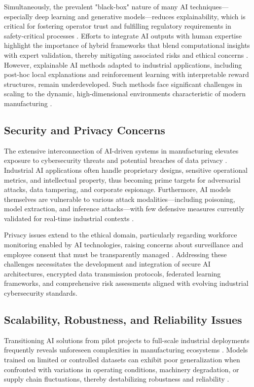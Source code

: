 \documentclass[sigconf]{acmart}
\begin{document}
Simultaneously, the prevalent "black-box" nature of many AI techniques—especially deep learning and generative models—reduces explainability, which is critical for fostering operator trust and fulfilling regulatory requirements in safety-critical processes \cite{ref2,ref34}. Efforts to integrate AI outputs with human expertise highlight the importance of hybrid frameworks that blend computational insights with expert validation, thereby mitigating associated risks and ethical concerns \cite{ref2}. However, explainable AI methods adapted to industrial applications, including post-hoc local explanations and reinforcement learning with interpretable reward structures, remain underdeveloped. Such methods face significant challenges in scaling to the dynamic, high-dimensional environments characteristic of modern manufacturing \cite{ref14,ref36}.

\subsection{Security and Privacy Concerns}

The extensive interconnection of AI-driven systems in manufacturing elevates exposure to cybersecurity threats and potential breaches of data privacy \cite{ref13,ref37}. Industrial AI applications often handle proprietary designs, sensitive operational metrics, and intellectual property, thus becoming prime targets for adversarial attacks, data tampering, and corporate espionage. Furthermore, AI models themselves are vulnerable to various attack modalities---including poisoning, model extraction, and inference attacks---with few defensive measures currently validated for real-time industrial contexts \cite{ref37,ref41}.

Privacy issues extend to the ethical domain, particularly regarding workforce monitoring enabled by AI technologies, raising concerns about surveillance and employee consent that must be transparently managed \cite{ref2}. Addressing these challenges necessitates the development and integration of secure AI architectures, encrypted data transmission protocols, federated learning frameworks, and comprehensive risk assessments aligned with evolving industrial cybersecurity standards.

\subsection{Scalability, Robustness, and Reliability Issues}

Transitioning AI solutions from pilot projects to full-scale industrial deployments frequently reveals unforeseen complexities in manufacturing ecosystems \cite{ref16,ref19}. Models trained on limited or controlled datasets can exhibit poor generalization when confronted with variations in operating conditions, machinery degradation, or supply chain fluctuations, thereby destabilizing robustness and reliability \cite{ref6,ref20}.
\end{document}
